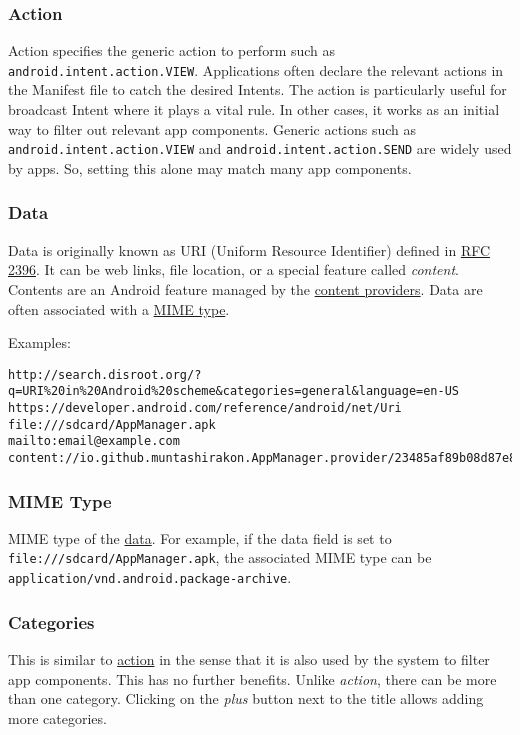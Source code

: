 \subsubsection{Action}\label{subsubsec:action}
Action specifies the generic action to perform such as \texttt{android.intent.action.VIEW}. Applications often declare
the relevant actions in the Manifest file to catch the desired Intents. The action is particularly useful for broadcast
Intent where it plays a vital rule. In other cases, it works as an initial way to filter out relevant app components.
Generic actions such as \texttt{android.intent.action.VIEW} and \texttt{android.intent.action.SEND} are widely used by
apps. So, setting this alone may match many app components.

\subsubsection{Data}\label{subsubsec:data}
Data is originally known as URI (Uniform Resource Identifier) defined in
\href{http://www.faqs.org/rfcs/rfc2396.html}{RFC 2396}. It can be web links, file location, or a special feature called
\textit{content}. Contents are an Android feature managed by the \hyperref[appdetails:providers]{content providers}.
Data are often associated with a \hyperref[subsubsec:mime-type]{MIME type}.

Examples:
\begin{Verbatim}
http://search.disroot.org/?q=URI%20in%20Android%20scheme&categories=general&language=en-US
https://developer.android.com/reference/android/net/Uri
file:///sdcard/AppManager.apk
mailto:email@example.com
content://io.github.muntashirakon.AppManager.provider/23485af89b08d87e898a90c7e/AppManager.apk
\end{Verbatim}

\subsubsection{MIME Type}\label{subsubsec:mime-type}
MIME type of the \hyperref[subsubsec:data]{data}. For example, if the data field is set to
\texttt{file:///sdcard/AppManager.apk}, the associated MIME type can be \texttt{application/vnd.android.package-archive}.

\subsubsection{Categories}
This is similar to \hyperref[subsubsec:action]{action} in the sense that it is also used by the system to filter app
components. This has no further benefits. Unlike \textit{action}, there can be more than one category. Clicking on the
\textit{plus} button next to the title allows adding more categories.

